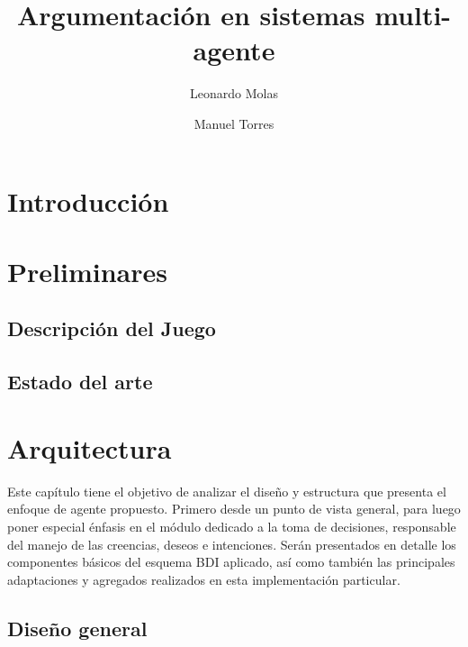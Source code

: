 \documentclass[oneside]{book}
\title{Argumentación en sistemas multi-agente} %
\author{Leonardo Molas \and Manuel Torres}
\begin{document}
\maketitle
\tableofcontents

\chapter*{Introducción}



\chapter{Preliminares} %


\section{Descripción del Juego}





\section{Estado del arte}


\chapter{Arquitectura} %

Este capítulo tiene el objetivo de analizar el diseño y estructura que presenta el 
enfoque de agente propuesto. Primero desde un punto de vista general, para luego 
poner especial énfasis en el módulo dedicado a la toma de decisiones, responsable 
del manejo de las creencias, deseos e intenciones. Serán presentados en detalle los 
componentes básicos del esquema BDI aplicado, así como también las principales 
adaptaciones y agregados realizados en esta implementación particular.

\section{Diseño general}
\end{document}
